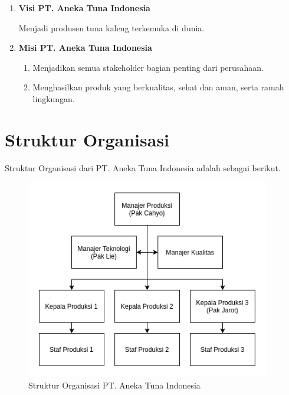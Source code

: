 \begin{enumerate}[nolistsep]

  \item \textbf{Visi PT. Aneka Tuna Indonesia}
  \vspace{0.5ex}

  Menjadi produsen tuna kaleng terkemuka di dunia.
  \vspace{0.5ex}

  \item \textbf{Misi PT. Aneka Tuna Indonesia}
  \vspace{0.5ex}

  \begin{enumerate}[nolistsep]

    \item Menjadikan semua stakeholder bagian penting dari perusahaan.
    \vspace{0.5ex}

    \item Menghasilkan produk yang berkualitas, sehat dan aman, serta ramah lingkungan.
    \vspace{0.5ex}

  \end{enumerate}
  \vspace{0.5ex}

\end{enumerate}
\vspace{0.5ex}

\section{Struktur Organisasi}
\vspace{1ex}

Struktur Organisasi dari PT. Aneka Tuna Indonesia adalah sebagai berikut.
\vspace{0.5ex}

\begin{figure} [ht] \centering
  \includegraphics[width=0.95\textwidth]{gambar/hirarki-ati.png}
  \caption{Struktur Organisasi PT. Aneka Tuna Indonesia}
  \label{fig:strukturOrganisasi}
\end{figure}

